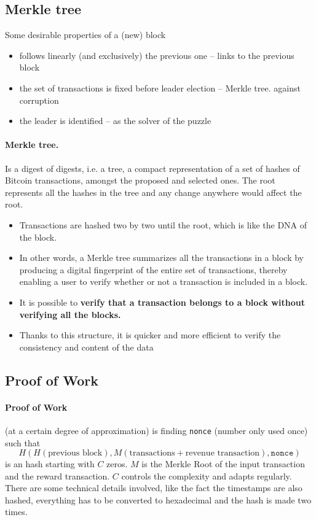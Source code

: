 \subsection{Merkle tree}

Some desirable properties of a (new) block
\begin{itemize}
    \item follows linearly (and exclusively) the previous one -- links to the previous block
    \item the set of transactions is fixed before leader election -- Merkle tree. against corruption
    \item the leader is identified -- as the solver of the puzzle
\end{itemize}

\paragraph*{Merkle tree.} Is a digest of digests, i.e. a tree, a compact representation of a set of hashes of Bitcoin transactions, amongst the proposed and selected ones. The root represents all the hashes in the tree and any change anywhere would affect the root.
\begin{itemize}
    \item Transactions are hashed two by two until the root, which is like the DNA of the block.
    \item In other words, a Merkle tree summarizes all the transactions in a block by producing a digital fingerprint of the entire set of transactions, thereby enabling a user to verify whether or not a transaction is included in a block.
    \item It is possible to \textbf{verify that a transaction belongs to a block without verifying all the blocks.}
    \item Thanks to this structure, it is quicker and more efficient to verify the consistency and content of the data
\end{itemize}


\subsection{Proof of Work}

\paragraph*{Proof of Work} (at a certain degree of approximation) is finding \texttt{nonce} (number only used once) such that
\begin{equation*}
    H(H(\text{previous block}),M(\text{transactions} +\text{revenue transaction}),\texttt{nonce})
\end{equation*}
is an hash starting with $C$ zeros. $M$ is the Merkle Root of the input transaction and the reward transaction. $C$ controls the complexity and adapts regularly. There are some technical details involved, like the fact the timestamps are also hashed, everything has to be converted to hexadecimal and the hash is made two times.

